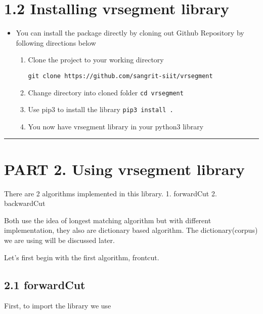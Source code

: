 \documentclass[11pt]{article}
\begin{document}
\section{1.2 Installing vrsegment
library}\label{installing-vrsegment-library}

\begin{itemize}
\item
  You can install the package directly by cloning out Github Repository
  by following directions below

  \begin{enumerate}
  \def\labelenumi{\arabic{enumi}.}
  \item
    Clone the project to your working directory

\begin{verbatim}
git clone https://github.com/sangrit-siit/vrsegment
\end{verbatim}
  \item
    Change directory into cloned folder \texttt{cd\ vrsegment}
  \item
    Use pip3 to install the library \texttt{pip3\ install\ .}
  \item
    You now have vrsegment library in your python3 library
  \end{enumerate}
\end{itemize}

\begin{center}\rule{0.5\linewidth}{\linethickness}\end{center}

    \section{PART 2. Using vrsegment
library}\label{part-2.-using-vrsegment-library}

There are 2 algorithms implemented in this library. 1. forwardCut 2.
backwardCut

Both use the idea of longest matching algorithm but with different
implementation, they also are dictionary based algorithm. The
dictionary(corpus) we are using will be discussed later.

Let's first begin with the first algorithm, frontcut.

\subsection{2.1 forwardCut}\label{forwardcut}

First, to import the library we use
\end{document}
